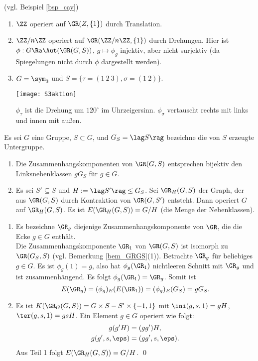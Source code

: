\BSP (vgl. Beispiel \ref{bsp_cay})
\begin{enumerate}
\item $\ZZ$ operiert auf $\GR(Z,\{1\})$ durch Translation.
\item $\ZZ/n\ZZ$ operiert auf $\GR(\ZZ/n\ZZ,\{1\})$ durch
Drehungen. Hier ist $\phi:G\Ra\Aut(\GR(G,S))$, $g\mapsto\phi_g$
injektiv, aber nicht surjektiv (da Spiegelungen nicht durch
$\phi$ dargestellt werden).
\item $G=\sym_3$ und $S=\{\tau=(1\ 2\ 3), \sigma=(1\ 2)\}$.
\begin{center}
	\texttt{[image: S3aktion]}
\end{center}
$\phi_{\tau}$ ist die Drehung um $120^{\circ}$ im
Uhrzeigersinn. $\phi_{\sigma}$ vertauscht rechts mit links und
innen mit außen.
\end{enumerate}

\PROP Es sei $G$ eine Gruppe, $S\subset G$, und $G_S=\lag S\rag$
bezeichne die von $S$ erzeugte Untergruppe.
\begin{enumerate}
\item Die Zusammenhangskomponenten von $\GR(G,S)$ entsprechen
bijektiv den Linksnebenklassen $g G_S$ für $g\in G$.
\item Es sei $S'\subseteq S$ und $H:=\lag S'\rag \leq G_S$.
Sei $\GR_H(G,S)$ der Graph, der aus $\GR(G,S)$ durch Kontraktion
von $\GR(G,S')$ entsteht.
Dann operiert $G$ auf $\GR_H(G,S)$.
Es ist $E(\GR_H(G,S)) = G/H$ (die Menge der Nebenklassen).
\end{enumerate}
\bew \begin{enumerate}
\item Es bezeichne $\GR_g$ diejenige Zusammenhangskomponente von
$\GR$, die die Ecke $g\in G$ enthält.\\
Die Zusammenhangskomponente $\GR_1$ von $\GR(G,S)$ ist isomorph
zu $\GR(G_S,S)$ (vgl. Bemerkung \ref{bem_GRGS}(1)).
Betrachte $\GR_g$ für beliebiges $g\in G$. Es ist $\phi_g(1)=g$,
also hat $\phi_g(\GR_1)$ nichtleeren Schnitt mit $\GR_g$ und ist
zusammenhängend. Es folgt $\phi_g(\GR_1)=\GR_g$.
Somit ist
\[
E(\GR_g)=(\phi_g)_E(E(\GR_1))=(\phi_g)_E(G_S) = g G_S.
\]
\item
Es ist $K(\GR_G(G,S))=G\times S-S'\times\{-1,1\}$ mit
$\ini(g,s,1)=gH$, $\ter(g,s,1)=gsH$.
Ein Element $g\in G$ operiert wie folgt:
\begin{align*}
g(g'H) &= (gg')H, \\
g(g',s,\eps) &= (gg',s,\eps).
\end{align*}
Aus Teil 1 folgt $E(\GR_H(G,S))=G/H$.
\qed
\end{enumerate}

